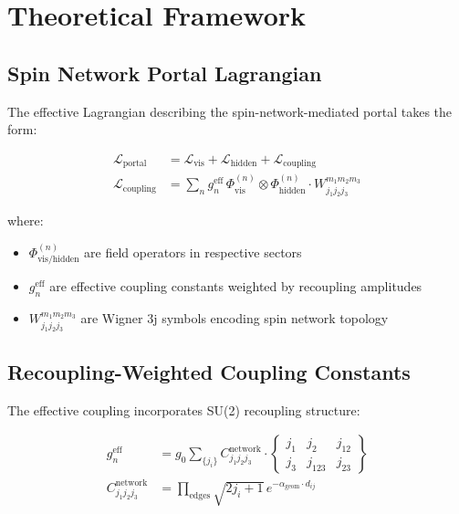 \documentclass{article}
\begin{document}








\section{Theoretical Framework}

\subsection{Spin Network Portal Lagrangian}

The effective Lagrangian describing the spin-network-mediated portal takes the form:

\begin{align}
\mathcal{L}_{\text{portal}} &= \mathcal{L}_{\text{vis}} + \mathcal{L}_{\text{hidden}} + \mathcal{L}_{\text{coupling}} \\
\mathcal{L}_{\text{coupling}} &= \sum_{n} g_n^{\text{eff}} \, \Phi_{\text{vis}}^{(n)} \otimes \Phi_{\text{hidden}}^{(n)} \cdot W_{j_1j_2j_3}^{m_1m_2m_3}
\end{align}

where:
\begin{itemize}
\item $\Phi_{\text{vis/hidden}}^{(n)}$ are field operators in respective sectors
\item $g_n^{\text{eff}}$ are effective coupling constants weighted by recoupling amplitudes
\item $W_{j_1j_2j_3}^{m_1m_2m_3}$ are Wigner 3j symbols encoding spin network topology
\end{itemize}

\subsection{Recoupling-Weighted Coupling Constants}

The effective coupling incorporates SU(2) recoupling structure:

\begin{align}
g_n^{\text{eff}} &= g_0 \sum_{\{j_i\}} C_{j_1j_2j_3}^{\text{network}} \cdot 
\begin{Bmatrix} j_1 & j_2 & j_{12} \\ j_3 & j_{123} & j_{23} \end{Bmatrix} \\
C_{j_1j_2j_3}^{\text{network}} &= \prod_{\text{edges}} \sqrt{2j_i + 1} \, e^{-\alpha_{\text{geom}} \cdot d_{ij}}
\end{align}
\end{document}
